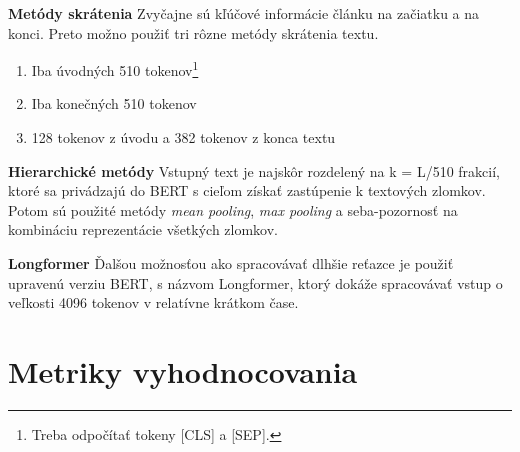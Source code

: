 \textbf{Metódy skrátenia} Zvyčajne sú kľúčové informácie článku na začiatku a na konci. Preto možno použiť tri rôzne metódy skrátenia textu.
\begin{enumerate}
    \item Iba úvodných 510 tokenov\footnote{Treba odpočítať tokeny [CLS] a [SEP].}
    \item Iba konečných 510 tokenov
    \item 128 tokenov z úvodu a 382 tokenov z konca textu
\end{enumerate}

\textbf{Hierarchické metódy} Vstupný text je najskôr rozdelený na k = L/510 frakcií, ktoré sa privádzajú do BERT s cieľom získať zastúpenie k textových zlomkov. Potom sú použité metódy \textit{mean pooling}, \textit{max pooling} a seba-pozornosť na kombináciu reprezentácie všetkých zlomkov.\cite{Sun:2019}

\textbf{Longformer} \cite{Beltagy:2020} Ďalšou možnosťou ako spracovávať dlhšie reťazce je použiť upravenú verziu BERT, s názvom Longformer, ktorý dokáže spracovávať vstup o veľkosti 4096 tokenov v relatívne krátkom čase.


\section{Metriky vyhodnocovania} \label{metriky}

